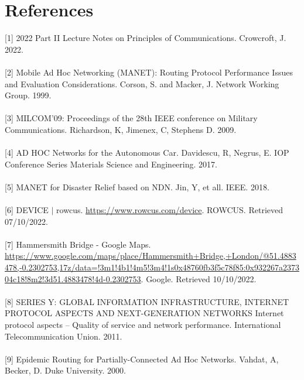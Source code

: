 \documentclass[10pt, a4paper]{article}
\begin{document}
\section*{References}
\label{routing}[1] 2022 Part II Lecture Notes on Principles of Communications. Crowcroft, J. 2022. \\ \\
\label{manet}[2]  Mobile Ad Hoc Networking (MANET): Routing Protocol Performance Issues and Evaluation Considerations. Corson, S. and Macker, J. Network Working Group. 1999. \\ \\
\label{jtrs}[3]  MILCOM'09: Proceedings of the 28th IEEE conference on Military Communications. Richardson, K, Jimenex, C, Stephens D. 2009. \\ \\ 
\label{auto}[4] AD HOC Networks for the Autonomous Car. Davidescu, R, Negrus, E. IOP Conference Series Materials Science and Engineering. 2017. \\ \\
\label{disaster}[5] MANET for Disaster Relief based on NDN. Jin, Y, et all. IEEE. 2018. \\ \\
\label{rowcus}[6] DEVICE $\vert$ rowcus. \url{https://www.rowcus.com/device}. ROWCUS. Retrieved 07/10/2022. \\ \\
\label{googlemaps}[7] Hammersmith Bridge - Google Maps. \url{https://www.google.com/maps/place/Hammersmith+Bridge,+London/@51.4883478,-0.2302753,17z/data=!3m1!4b1!4m5!3m4!1s0x48760fb3f5c78f85:0x932267a237304c18!8m2!3d51.4883478!4d-0.2302753}. Google. Retrieved 10/10/2022. \\\\
\label{itu}[8] SERIES Y: GLOBAL INFORMATION 
INFRASTRUCTURE, INTERNET PROTOCOL ASPECTS 
AND NEXT-GENERATION NETWORKS 
Internet protocol aspects – Quality of service and network 
performance. International Telecommunication Union. 2011. \\ \\
\label{epidemic}[9] Epidemic Routing for Partially-Connected Ad Hoc Networks. Vahdat, A, Becker, D. Duke University. 2000.
\end{document}

